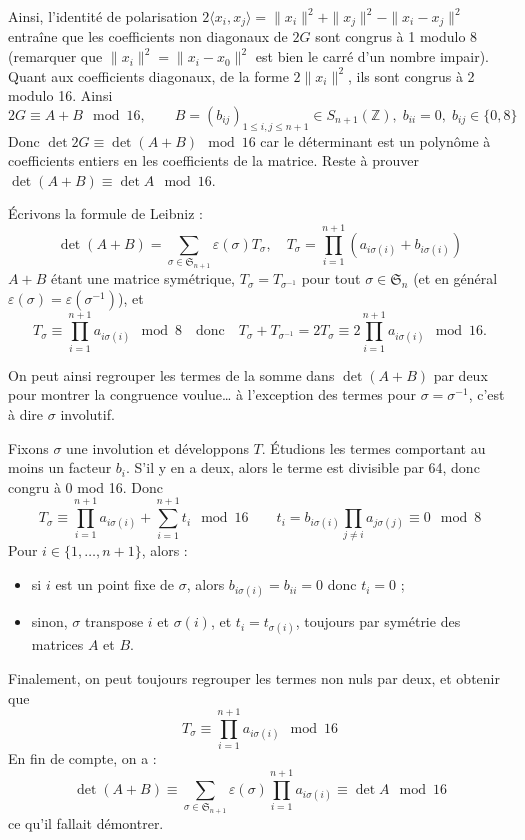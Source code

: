 \documentclass[a4paper, 11pt]{article}
\def\Z{\mathbb{Z}}
\def\Sigmap{\mathfrak{S}}
\begin{document}
Ainsi, l'identité de polarisation $2 \langle x_i, x_j \rangle = \|x_i\|^2 +
\|x_j\|^2 - \|x_i - x_j\|^2$ entraîne que les coefficients non diagonaux de $2G$
sont congrus à 1 modulo 8 (remarquer que $\|x_i\|^2 = \|x_i - x_0\|^2$ est bien
le carré d'un nombre impair). Quant aux coefficients diagonaux, de la forme
$2\|x_i\|^2$, ils sont congrus à 2 modulo 16. Ainsi
\[ 2G \equiv A + B \mod 16, \qquad B = (b_{ij})_{1 \leq i,j \leq n+1} \in
  S_{n+1}(\Z),\; b_{ii} = 0,\; b_{ij} \in \{0,8\} \]
Donc $\det 2G \equiv \det(A+B) \mod 16$ car le déterminant est un polynôme à
coefficients entiers en les coefficients de la matrice. Reste à prouver
$\det(A+B) \equiv \det A \mod 16$.

Écrivons la formule de Leibniz :
\[ \det(A+B) = \sum_{\sigma \in \Sigmap_{n+1}} \varepsilon(\sigma) T_\sigma,
  \quad T_\sigma = \prod_{i=1}^{n+1} (a_{i \sigma(i)} + b_{i \sigma(i)}) \]
$A+B$ étant une matrice symétrique, $T_\sigma = T_{\sigma^{-1}}$ pour tout
$\sigma \in \Sigmap_n$ (et en général $\varepsilon(\sigma) =
\varepsilon(\sigma^{-1})$), et
\[ T_\sigma \equiv \prod_{i=1}^{n+1} a_{i \sigma(i)} \mod 8 \quad \text{donc}
  \quad T_\sigma + T_{\sigma^{-1}} = 2 T_\sigma \equiv 2 \prod_{i=1}^{n+1} a_{i
    \sigma(i)} \mod 16. \]

On peut ainsi regrouper les termes de la somme dans $\det(A+B)$ par deux pour
montrer la congruence voulue… à l'exception des termes pour $\sigma =
\sigma^{-1}$, c'est à dire $\sigma$ involutif.

Fixons $\sigma$ une involution et développons $T$. Étudions les termes
comportant au moins un facteur $b_i$. S'il y en a deux, alors le terme est
divisible par 64, donc congru à 0 mod 16. Donc
\[ T_\sigma \equiv \prod_{i=1}^{n+1} a_{i \sigma(i)} + \sum_{i=1}^{n+1} t_i
  \mod 16 \qquad t_i = b_{i \sigma(i)} \prod_{j \neq i} a_{j \sigma(j)}
  \equiv 0 \mod 8 \]
Pour $i \in \{1, \ldots, n+1\}$, alors :
\begin{itemize}
\item si $i$ est un point fixe de $\sigma$, alors $b_{i \sigma(i)} = b_{ii} = 0$
  donc $t_i = 0$ ;
\item sinon, $\sigma$ transpose $i$ et $\sigma(i)$, et $t_i = t_{\sigma(i)}$,
  toujours par symétrie des matrices $A$ et $B$.
\end{itemize}
Finalement, on peut toujours regrouper les termes non nuls par deux, et obtenir
que
\[ T_\sigma \equiv \prod_{i=1}^{n+1} a_{i \sigma(i)} \mod 16 \]
En fin de compte, on a :
\[ \det(A+B) \equiv \sum_{\sigma \in \Sigmap_{n+1}} \varepsilon(\sigma)
  \prod_{i=1}^{n+1} a_{i \sigma(i)} \equiv \det A \mod 16 \]
ce qu'il fallait démontrer.
\end{document}
